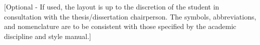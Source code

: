 

[Optional - If used, the layout is up to the discretion of the student in consultation with the thesis/dissertation chairperson. The symbols, abbreviations, and nomenclature are to be consistent with those specified by the academic discipline and style manual.]